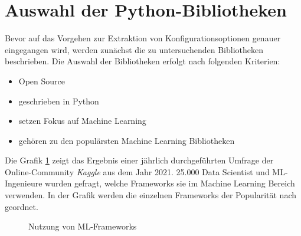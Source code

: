 \documentclass[german,bachelor]{swsLeipzig}
\begin{document}
\section{Auswahl der Python-Bibliotheken}\label{choice}
Bevor auf das Vorgehen zur Extraktion von Konfigurationsoptionen genauer eingegangen wird, werden zunächst die
zu untersuchenden Bibliotheken beschrieben.
Die Auswahl der Bibliotheken erfolgt nach folgenden Kriterien:
\begin{itemize}
 \item Open Source
 \item geschrieben in Python
 \item setzen Fokus auf Machine Learning
 \item gehören zu den populärsten Machine Learning Bibliotheken
\end{itemize}

\noindent Die Grafik \ref{fig:kaggle} zeigt das Ergebnis einer jährlich durchgeführten Umfrage der Online-Community \textit{Kaggle}
aus dem Jahr 2021.
25.000 Data Scientist und ML-Ingenieure wurden gefragt, welche Frameworks sie im Machine Learning Bereich verwenden.
In der Grafik werden die einzelnen Frameworks der Popularität nach geordnet.\\

\begin{figure}[H]
\begin{center}
\caption{Nutzung von ML-Frameworks \cite[]{kaggle}} \label{fig:kaggle}
\end{center}
\end{figure}
\end{document}
